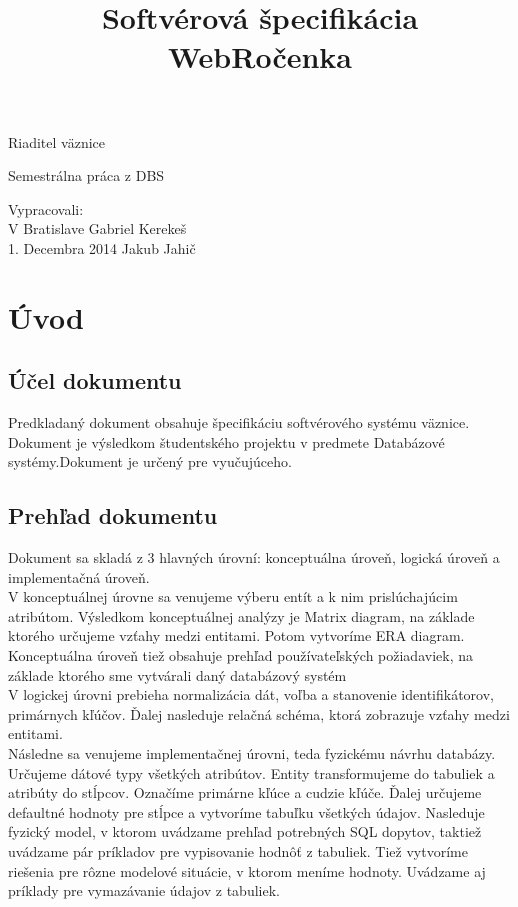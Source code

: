 \documentclass[slovak, 12pt, Times New Roman]{article}
\begin{document}
	\thispagestyle{fancy}
		\begin{center}\huge{Riaditel väznice\\\par}Semestrálna práca z DBS\end{center}
	\title{Softvérová špecifikácia WebRočenka}
	\date{}

	\begin{minipage}[b]{\textwidth}
	    \vspace{110mm}	 
	    \large   	\hspace{110mm} Vypracovali:\\
	    V Bratislave \hspace{82mm} Gabriel Kerekeš \\
	    1. Decembra 2014 \hspace{70mm} Jakub Jahič \\
	    \vspace{-20mm} 
	\end{minipage}

	\clearpage
	\tableofcontents
	\clearpage

	\section{Úvod}
		\subsection{Účel dokumentu}
			Predkladaný dokument obsahuje špecifikáciu softvérového systému väznice. Dokument je výsledkom študentského projektu v predmete Databázové systémy.Dokument je určený pre vyučujúceho.
		\subsection{Prehľad dokumentu}
			Dokument sa skladá z 3 hlavných úrovní: konceptuálna úroveň, logická úroveň a implementačná úroveň.\\
			V konceptuálnej úrovne sa venujeme výberu entít a k nim prislúchajúcim atribútom. Výsledkom konceptuálnej analýzy je Matrix diagram, na základe ktorého určujeme vzťahy medzi entitami. Potom vytvoríme ERA diagram.\\
			Konceptuálna úroveň tiež obsahuje prehľad používateľských požiadaviek, na základe ktorého sme vytvárali daný databázový systém\\
			V logickej úrovni prebieha normalizácia dát, voľba a stanovenie identifikátorov, primárnych kľúčov. Ďalej nasleduje relačná schéma, ktorá zobrazuje vzťahy medzi entitami. \\
			Následne sa venujeme implementačnej úrovni, teda fyzickému návrhu databázy. Určujeme dátové typy všetkých atribútov. Entity transformujeme do tabuliek a atribúty do stĺpcov. Označíme primárne kľúce a cudzie kľúče. Ďalej určujeme defaultné hodnoty pre stĺpce a vytvoríme tabuľku všetkých údajov. Nasleduje fyzický model, v ktorom uvádzame prehľad potrebných SQL dopytov, taktiež uvádzame pár príkladov pre vypisovanie hodnôť z tabuliek. Tiež vytvoríme riešenia pre rôzne modelové situácie, v ktorom meníme hodnoty. Uvádzame aj príklady pre vymazávanie údajov z tabuliek. 
\end{document}
